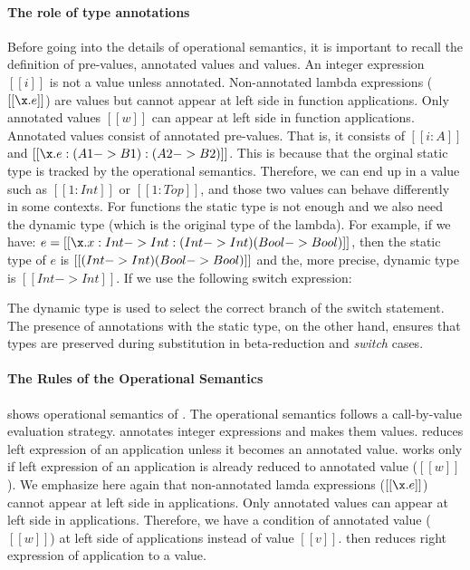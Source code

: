 \paragraph{The role of type annotations}
Before going
into the details of operational semantics, it is important to recall
the definition of pre-values, annotated values and values.
An integer expression $[[i]]$ is not a value unless annotated.
Non-annotated lambda expressions ($[[\x.e]]$) are values but cannot appear at left
side in function applications.
Only annotated values $[[w]]$ can appear at left side in function applications.
Annotated values consist of annotated pre-values. That is, it consists of
$[[i:A]]$ and $[[\x.e:(A1->B1):(A2->B2)]]$. This is
because that the orginal static type is tracked by the operational semantics.
Therefore, we can end up in a value such as $[[1 : Int]]$ or $[[1 : Top]]$,
and those two values can behave differently in some contexts.
For functions the static type is not enough and we also need the dynamic type
(which is the original type of the lambda).
For example, if we have:
$e = [[\x.x:Int->Int:(Int->Int)\/(Bool->Bool)]]$, then the static type of $e$ is
$[[(Int->Int)\/(Bool->Bool)]]$ and the, more precise, dynamic type is
$[[Int->Int]]$. If we use the following switch expression:


The dynamic type is used to select the correct branch of the switch statement.
The presence of annotations with the static type, on the other hand,
ensures that types are preserved during substitution in
beta-reduction and \emph{switch} cases.

\paragraph{The Rules of the Operational Semantics}
 shows operational semantics of \cal.
The operational semantics follows a call-by-value evaluation strategy.
 annotates integer expressions and makes them
values.  reduces left expression of an application
unless it becomes an annotated value.  works only if left
expression of an application is already reduced to annotated
value ($[[w]]$). We emphasize here again that non-annotated lamda expressions
($[[\x.e]]$) cannot appear at left side in applications.
Only annotated values can appear at left side in applications.
Therefore, we have a condition of annotated value ($[[w]]$) at left
side of applications instead of value $[[v]]$.
 then reduces right expression of application
to a value.

